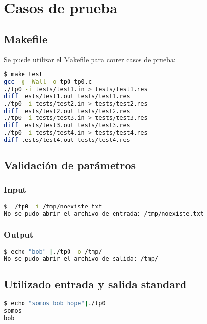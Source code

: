 \documentclass[10pt,a4paper]{article}
\begin{document}
\newpage

\section{Casos de prueba}

\subsection{Makefile}

Se puede utilizar el Makefile para correr casos de prueba:

\begin{lstlisting}[language=bash]
$ make test
gcc -g -Wall -o tp0 tp0.c 
./tp0 -i tests/test1.in > tests/test1.res
diff tests/test1.out tests/test1.res
./tp0 -i tests/test2.in > tests/test2.res
diff tests/test2.out tests/test2.res
./tp0 -i tests/test3.in > tests/test3.res
diff tests/test3.out tests/test3.res
./tp0 -i tests/test4.in > tests/test4.res
diff tests/test4.out tests/test4.res
\end{lstlisting}

\subsection{Validación de parámetros}

\subsubsection{Input}

\begin{lstlisting}[language=bash]
$ ./tp0 -i /tmp/noexiste.txt
No se pudo abrir el archivo de entrada: /tmp/noexiste.txt
\end{lstlisting}

\subsubsection{Output}

\begin{lstlisting}[language=bash]
$ echo "bob" |./tp0 -o /tmp/
No se pudo abrir el archivo de salida: /tmp/
\end{lstlisting}

\subsection{Utilizado entrada y salida standard}

\begin{lstlisting}[language=bash]
$ echo "somos bob hope"|./tp0 
somos
bob
\end{lstlisting}
\end{document}
